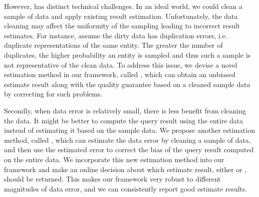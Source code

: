 
However, \saqpplus has distinct technical challenges.
In an ideal world, we could clean a sample of data and apply existing \saqp result estimation.
Unfortunately, the data cleaning may affect the uniformity of the sampling leading to incorrect result estimates.
For instance, assume the dirty data has duplication errors, i.e. duplicate representations of the same entity.
The greater the number of duplicates, the higher probability an entity is sampled and thus such a sample is not representative of the clean data.
To address this issue, we devise a novel estimation method in our framework, called \sampleclean, which can obtain an unbiased estimate result along with the quality guarantee based on a cleaned sample data by correcting for such problems.


Secondly, when data error is relatively small, there is less benefit from cleaning the data.
It might be better to compute the query result using the entire data instead of estimating it based on the sample data.
We propose another estimation method, called \bias, which can estimate the data error by cleaning a sample of data, and then use the estimated error to correct the bias of the query result computed on the entire data.
We incorporate this new estimation method into our framework and make an online decision about which estimate result, either \sampleclean or \bias, should be returned.
This makes our framework very robust to different magnitudes of data error, and we can consistently report good estimate results. 



